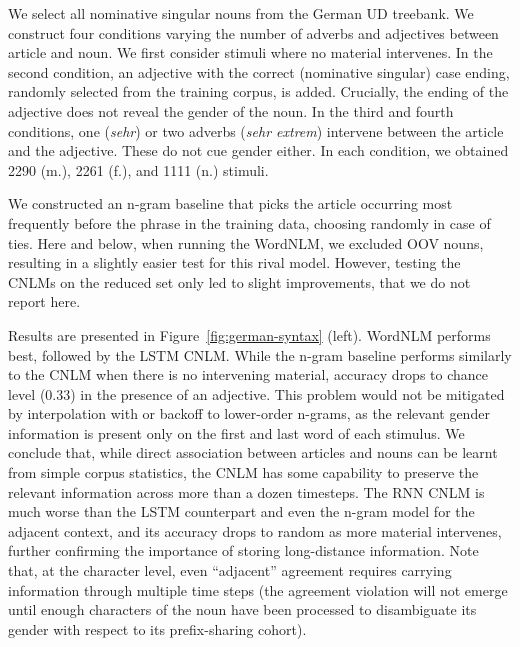 We select all nominative singular nouns from the German UD treebank. %
We construct four conditions varying the number of adverbs and adjectives between  article and noun.
We first consider stimuli where no material intervenes. %
In the second condition, an adjective with the correct (nominative singular) case ending, randomly selected from the training corpus, is added. Crucially, the ending of the adjective does not reveal the gender of the noun.
In the third and fourth conditions, one (\emph{sehr}) or two adverbs (\emph{sehr extrem}) intervene between the article and the adjective. These do not cue gender either. In each condition, we obtained 2290 (m.), 2261 (f.), and 1111 (n.) stimuli.

We constructed an n-gram baseline that picks the article occurring
most frequently before the phrase in the training data, choosing
randomly in case of ties. Here and below, when running the
WordNLM, we excluded OOV nouns, resulting in a slightly easier test
for this rival model. However, testing the CNLMs on the reduced set
only led to slight improvements, that we do not report here.

Results are presented in Figure~\ref{fig:german-syntax}
(left). WordNLM performs best, followed by the LSTM CNLM.  While the
n-gram baseline performs similarly to the CNLM when there is no
intervening material, accuracy drops to chance level (0.33) in the
presence of an adjective. This problem would not be mitigated by
interpolation with or backoff to lower-order n-grams, as the relevant
gender information is present only on the first and last word of each
stimulus. We conclude that, while direct association between articles
and nouns can be learnt from simple corpus statistics, the CNLM has
some capability to preserve the relevant information across more than
a dozen timesteps. The RNN CNLM is much worse than the LSTM
counterpart and even the n-gram model for the adjacent context, and
its accuracy drops to random as more material intervenes, further
confirming the importance of storing long-distance information. Note
that, at the character level, even ``adjacent'' agreement requires
carrying information through multiple time steps (the agreement
violation will not emerge until enough characters of the noun have
been processed to disambiguate its gender with respect to its
prefix-sharing cohort).

